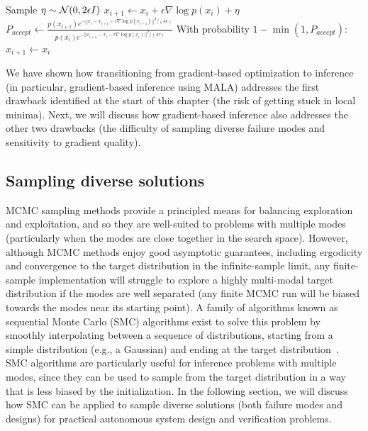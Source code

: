 \begin{algorithm}
    \caption{Metropolis-adjusted Langevin algorithm (MALA,~\cite{maSamplingCanBe2019,robertsLangevinDiffusionsMetropolisHastings2002})\label{ch:corl:alg:mala}}
    \DontPrintSemicolon
    {
    Sample $\eta \sim \mathcal{N}(0, 2\epsilon I)$ \;
    $x_{i+1} \gets x_i + \epsilon \nabla \log p(x_i) + \eta$ \;\label{ch:corl:alg:mala:step}
    $P_{accept} \gets \frac{p(x_{i+1}) e^{-||x_i - x_{i+1} - \epsilon \nabla \log p(x_{i+1})||^2 / (4\epsilon)}}{p(x_{i}) e^{-||x_{i+1} - x_{i} - \epsilon \nabla \log p(x_{i})||^2 / (4\tau)}}$ \;
    With probability $1 - \min(1, P_{accept})$:
    \hspace{2em}$x_{i+1} \gets x_{i}$ \;\label{ch:corl:alg:mala:mh}
    }
\end{algorithm}

We have shown how transitioning from gradient-based optimization to inference (in particular, gradient-based inference using MALA) addresses the first drawback identified at the start of this chapter (the risk of getting stuck in local minima). Next, we will discuss how gradient-based inference also addresses the other two drawbacks (the difficulty of sampling diverse failure modes and sensitivity to gradient quality).

\subsection{Sampling diverse solutions}

MCMC sampling methods provide a principled means for balancing exploration and exploitation, and so they are well-suited to problems with multiple modes (particularly when the modes are close together in the search space). However, although MCMC methods enjoy good asymptotic guarantees, including ergodicity and convergence to the target distribution in the infinite-sample limit, any finite-sample implementation will struggle to explore a highly multi-modal target distribution if the modes are well separated (any finite MCMC run will be biased towards the modes near its starting point). A family of algorithms known as sequential Monte Carlo (SMC) algorithms exist to solve this problem by smoothly interpolating between a sequence of distributions, starting from a simple distribution (e.g., a Gaussian) and ending at the target distribution~\cite{chopinIntroductionSequentialMonte2020}. SMC algorithms are particularly useful for inference problems with multiple modes, since they can be used to sample from the target distribution in a way that is less biased by the initialization. In the following section, we will discuss how SMC can be applied to sample diverse solutions (both failure modes and designs) for practical autonomous system design and verification problems.

